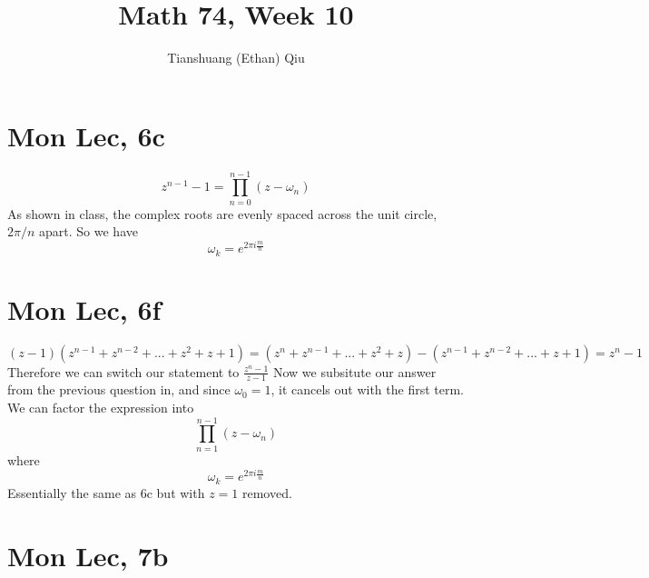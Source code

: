 \documentclass[12pt]{article}
\author{Tianshuang (Ethan) Qiu}
\begin{document}
\title{Math 74, Week 10}
\maketitle

\section{Mon Lec, 6c}
$$z^{n-1}-1 = \prod_{n=0}^{n-1}(z-\omega_n)$$
As shown in class, the complex roots are evenly spaced across the unit circle, $2\pi/n$ apart. So we have
$$\omega_k = e^{2\pi i \frac{m}{n}}$$


\section{Mon Lec, 6f}
$$(z-1)(z^{n-1}+z^{n-2}+...+z^{2}+z+1) = (z^n+z^{n-1}+...+z^2+z)-(z^{n-1}+z^{n-2}+...+z+1)=z^n-1$$
Therefore we can switch our statement to $\frac{z^n-1}{z-1}$
\newline
Now we subsitute our answer from the previous question in, and since $\omega_0=1$, it cancels out with the first term.
\newline
We can factor the expression into
$$\prod_{n=1}^{n-1}(z-\omega_n)$$
where
$$\omega_k = e^{2\pi i \frac{m}{n}}$$
Essentially the same as 6c but with $z=1$ removed.


\section{Mon Lec, 7b}
\end{document}
